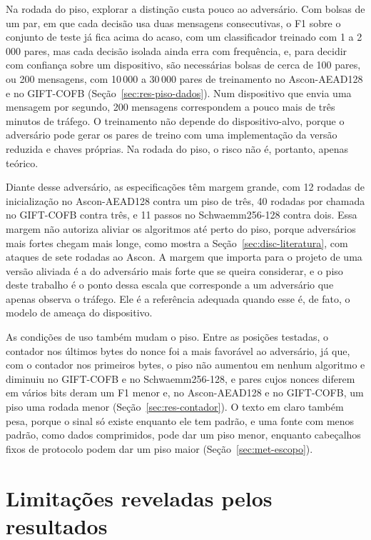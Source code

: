 Na rodada do piso, explorar a distinção custa pouco ao adversário. Com bolsas de um par, em que cada decisão usa duas mensagens consecutivas, o F1 sobre o conjunto de teste já fica acima do acaso, com um classificador treinado com 1 a 2\,000 pares, mas cada decisão isolada ainda erra com frequência, e, para decidir com confiança sobre um dispositivo, são necessárias bolsas de cerca de 100 pares, ou 200 mensagens, com 10\,000 a 30\,000 pares de treinamento no Ascon-AEAD128 e no GIFT-COFB (Seção~\ref{sec:res-piso-dados}). Num dispositivo que envia uma mensagem por segundo, 200 mensagens correspondem a pouco mais de três minutos de tráfego. O treinamento não depende do dispositivo-alvo, porque o adversário pode gerar os pares de treino com uma implementação da versão reduzida e chaves próprias. Na rodada do piso, o risco não é, portanto, apenas teórico.

Diante desse adversário, as especificações têm margem grande, com 12 rodadas de inicialização no Ascon-AEAD128 contra um piso de três, 40 rodadas por chamada no GIFT-COFB contra três, e 11 passos no Schwaemm256-128 contra dois. Essa margem não autoriza aliviar os algoritmos até perto do piso, porque adversários mais fortes chegam mais longe, como mostra a Seção~\ref{sec:disc-literatura}, com ataques de sete rodadas ao Ascon. A margem que importa para o projeto de uma versão aliviada é a do adversário mais forte que se queira considerar, e o piso deste trabalho é o ponto dessa escala que corresponde a um adversário que apenas observa o tráfego. Ele é a referência adequada quando esse é, de fato, o modelo de ameaça do dispositivo.

As condições de uso também mudam o piso. Entre as posições testadas, o contador nos últimos bytes do nonce foi a mais favorável ao adversário, já que, com o contador nos primeiros bytes, o piso não aumentou em nenhum algoritmo e diminuiu no GIFT-COFB e no Schwaemm256-128, e pares cujos nonces diferem em vários bits deram um F1 menor e, no Ascon-AEAD128 e no GIFT-COFB, um piso uma rodada menor (Seção~\ref{sec:res-contador}). O texto em claro também pesa, porque o sinal só existe enquanto ele tem padrão, e uma fonte com menos padrão, como dados comprimidos, pode dar um piso menor, enquanto cabeçalhos fixos de protocolo podem dar um piso maior (Seção~\ref{sec:met-escopo}).

\section{Limitações reveladas pelos resultados}
\label{sec:disc-limitacoes}

